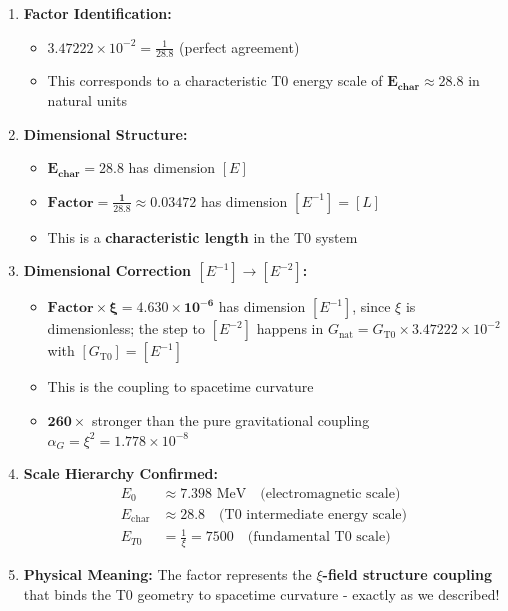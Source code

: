 	\begin{enumerate}
		\item \textbf{Factor Identification:}
		\begin{itemize}
			\item $3.47222 \times 10^{-2} = \frac{1}{28.8}$ (perfect agreement)
			\item This corresponds to a characteristic T0 energy scale of $\mathbf{E_{\text{char}} \approx 28.8}$ in natural units
		\end{itemize}
		
		\item \textbf{Dimensional Structure:}
		\begin{itemize}
			\item $\mathbf{E_{\text{char}} = 28.8}$ has dimension $[E]$
			\item $\mathbf{\text{Factor} = \frac{1}{28.8} \approx 0.03472}$ has dimension $[E^{-1}] = [L]$
			\item This is a \textbf{characteristic length} in the T0 system
		\end{itemize}
		
		\item \textbf{Dimensional Correction $[E^{-1}] \rightarrow [E^{-2}]$:}
		\begin{itemize}
			\item $\symbf{\text{Factor} \times \xi = 4.630 \times 10^{-6}}$ has dimension $[E^{-1}]$, since $\xi$ is dimensionless; the step to $[E^{-2}]$ happens in $G_{\text{nat}} = G_{\text{T0}} \times 3.47222 \times 10^{-2}$ with $[G_{\text{T0}}] = [E^{-1}]$
			\item This is the coupling to spacetime curvature
			\item $\mathbf{260\times}$ stronger than the pure gravitational coupling $\alpha_G = \xi^2 = 1.778 \times 10^{-8}$
		\end{itemize}
		
		\item \textbf{Scale Hierarchy Confirmed:}
		\begin{align}
			E_0 &\approx 7.398 \text{ MeV} \quad \text{(electromagnetic scale)} \\
			E_{\text{char}} &\approx 28.8 \quad \text{(T0 intermediate energy scale)} \\
			E_{T0} &= \frac{1}{\xi} = 7500 \quad \text{(fundamental T0 scale)}
		\end{align}
		
		\item \textbf{Physical Meaning:}
		The factor represents the \textbf{$\xi$-field structure coupling} that binds the T0 geometry to spacetime curvature - exactly as we described!
	\end{enumerate}
	
